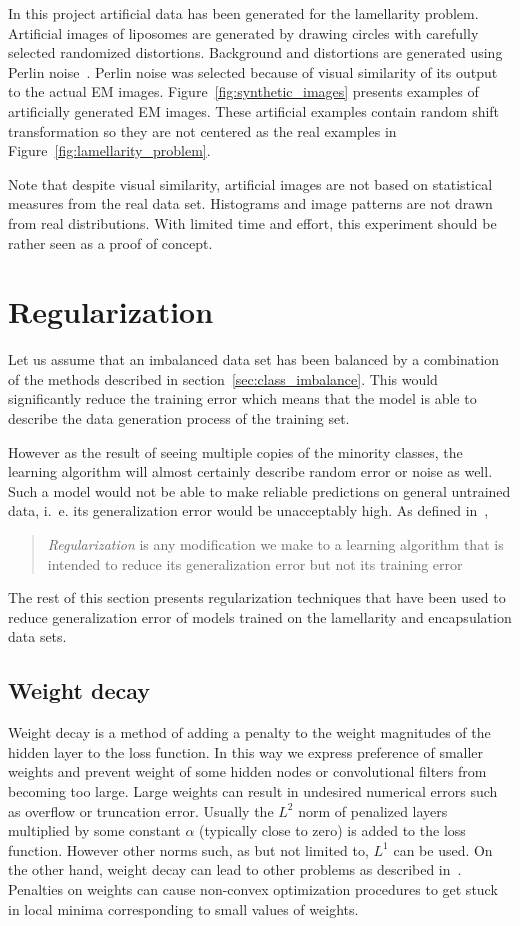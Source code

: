 \documentclass[a4paper, 11pt, table]{article}
\begin{document}
In this project artificial data has been generated for the lamellarity problem. Artificial images of liposomes are generated by drawing circles with carefully selected randomized distortions. Background and distortions are generated using Perlin noise~\cite{Perlin:1985:IS:325165.325247}. Perlin noise was selected because of visual similarity of its output to the actual EM images. Figure~\ref{fig:synthetic_images} presents examples of artificially generated EM images. These artificial examples contain random shift transformation so they are not centered as the real examples in Figure~\ref{fig:lamellarity_problem}.

Note that despite visual similarity, artificial images are not based on statistical measures from the real data set. Histograms and image patterns are not drawn from real distributions. With limited time and effort, this experiment should be rather seen as a proof of concept.

\section{Regularization}
\label{sec:regularization}

Let us assume that an imbalanced data set has been balanced by a combination of the methods described in section~\ref{sec:class_imbalance}. This would significantly reduce the training error which means that the model is able to describe the data generation process of the training set. 

However as the result of seeing multiple copies of the minority classes, the learning algorithm will almost certainly describe random error or noise as well. Such a model would not be able to make reliable predictions on general untrained data, i.~e. its generalization error would be unacceptably high. As defined in~\cite{dl_book}, \blockquote{\textit{Regularization} is any modification we make to a learning algorithm that is intended to reduce its generalization error but not its training error}.

The rest of this section presents regularization techniques that have been used to reduce generalization error of models trained on the lamellarity and encapsulation data sets.

\subsection{Weight decay}
Weight decay is a method of adding a penalty to the weight magnitudes of the hidden layer to the loss function. In this way we express preference of smaller weights and prevent weight of some hidden nodes or convolutional filters from becoming too large. Large weights can result in undesired numerical errors such as overflow or truncation error. Usually the $L^2$ norm of penalized layers multiplied by some constant $\alpha$ (typically close to zero) is added to the loss function. However other norms such, as but not limited to, $L^1$ can be used. 
On the other hand, weight decay can lead to other problems as described in~\cite{dl_book}. Penalties on weights can cause non-convex optimization procedures to get stuck in local minima corresponding to small values of weights. 
\end{document}
